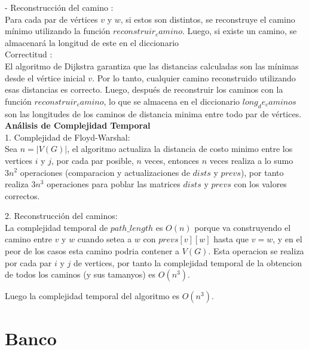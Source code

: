 \documentclass[
10pt, %
a4paper, %
oneside, %
headinclude,footinclude, %
BCOR5mm, %
]{scrartcl}
\begin{document}
- Reconstrucción del camino : \\
Para cada par de vértices $v$ y $w$, si estos son distintos, se reconstruye el camino mínimo utilizando la función $reconstruir_camino$. Luego, 
si existe un camino, se almacenará la longitud de este en el diccionario\\


Correctitud : \\
El algoritmo de Dijkstra garantiza que las distancias calculadas son las mínimas desde el vértice inicial $v$. Por lo tanto, 
cualquier camino reconstruido utilizando esas distancias es correcto. Luego, después de reconstruir los caminos con la función $reconstruir_camino$, 
lo que se almacena en el diccionario $long_de_caminos$ son las longitudes de los caminos de distancia minima entre todo par de 
vértices.\\


\textbf{Análisis de Complejidad Temporal}\\

1. Complejidad de Floyd-Warshal:\\

Sea $n = |V(G)|$, el algoritmo actualiza la distancia de costo minimo entre los vertices $i$ y $j$, por cada par posible, $n$ veces, entonces $n$ veces realiza a lo sumo $3n^2$ operaciones (comparacion y actualizaciones de $dists$ y $prevs$),
por tanto realiza $3n^3$ operaciones para poblar las matrices $dists$ y $prevs$ con los valores correctos.

2. Reconstrucción del caminos:\\

La complejidad temporal de $path\_length$ es $O (n)$ porque va construyendo el camino entre $v$ y $w$ cuando setea a $w$ con $prevs[v][w]$ hasta que $v = w$, y en el peor de los casos
esta camino podria contener a $V(G)$. Esta operacion se realiza por cada par $i$ y $j$ de vertices, por tanto la complejidad temporal de la obtencion de todos los caminos (y sus tamanyos) es
$O (n^3)$.

Luego la complejidad temporal del algoritmo es $O (n^3)$.



 

\section{Banco}
\end{document}
